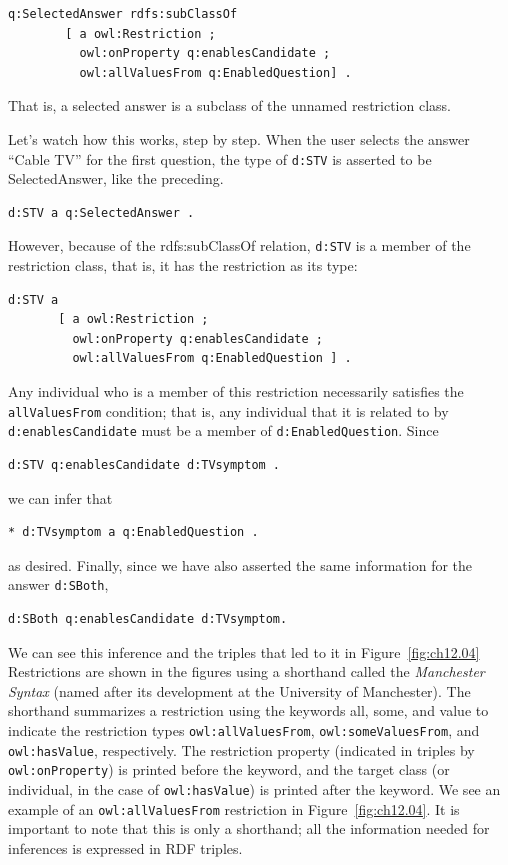 \begin{lstlisting}
q:SelectedAnswer rdfs:subClassOf
        [ a owl:Restriction ;
          owl:onProperty q:enablesCandidate ;
          owl:allValuesFrom q:EnabledQuestion] .
\end{lstlisting}

That is, a selected answer is a subclass of the unnamed restriction
class.

Let's watch how this works, step by step. When the user selects the
answer ``Cable TV'' for the first question, the type of \texttt{d:STV} is
asserted to be SelectedAnswer, like the preceding.

\begin{lstlisting}
d:STV a q:SelectedAnswer .
\end{lstlisting}

However, because of the rdfs:subClassOf relation, \texttt{d:STV} is a member of
the restriction class, that is, it has the restriction as its type:

\begin{lstlisting}
d:STV a
       [ a owl:Restriction ;
         owl:onProperty q:enablesCandidate ;
         owl:allValuesFrom q:EnabledQuestion ] .
\end{lstlisting}

Any individual who is a member of this restriction necessarily satisfies
the \texttt{allValuesFrom} condition; that is, any individual that it is related
to by
\texttt{d:enablesCandidate} must be a member of \texttt{d:EnabledQuestion}. Since

\begin{lstlisting}
d:STV q:enablesCandidate d:TVsymptom .
\end{lstlisting}

we can infer that

\begin{lstlisting}
* d:TVsymptom a q:EnabledQuestion .
\end{lstlisting}

as desired. Finally, since we have also asserted the same information
for the answer \texttt{d:SBoth},

\begin{lstlisting}
d:SBoth q:enablesCandidate d:TVsymptom.
\end{lstlisting}

We can see this inference and the triples that led to it in Figure~\ref{fig:ch12.04}
Restrictions are shown in the figures using a shorthand called the
\emph{Manchester Syntax} (named after its development at the University of
Manchester). The shorthand summarizes a restriction using the keywords
all, some, and value to indicate the restriction types
\texttt{owl:allValuesFrom}, \texttt{owl:someValuesFrom}, and
\texttt{owl:hasValue}, respectively. The restriction property (indicated in
triples by \texttt{owl:onProperty}) is printed before the keyword, and the target
class (or individual, in the case of \texttt{owl:hasValue}) is printed after the
keyword. We see an example of an \texttt{owl:allValuesFrom} restriction in Figure~\ref{fig:ch12.04}. It is important to note that this is only a shorthand; all the
information needed for inferences is expressed in RDF triples.

